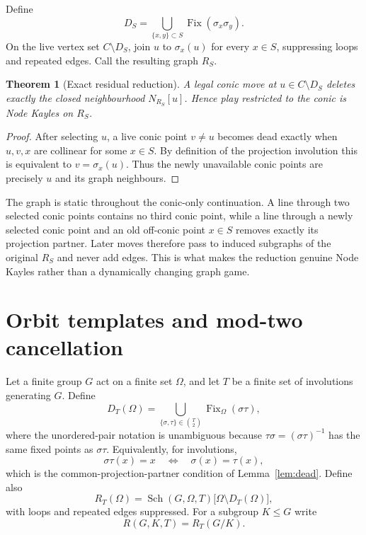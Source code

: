 \documentclass[11pt]{article}
\newtheorem{theorem}{Theorem}[section]
\theoremstyle{definition}
\theoremstyle{remark}
\DeclareMathOperator{\Fix}{Fix}
\DeclareMathOperator{\Sch}{Sch}
\begin{document}
Define
\begin{equation}
  D_S=\bigcup_{\{x,y\}\subset S}\Fix(\sigma_x\sigma_y).
  \label{eq:DS}
\end{equation}
On the live vertex set $C\setminus D_S$, join $u$ to $\sigma_x(u)$ for every $x\in S$, suppressing
loops and repeated edges. Call the resulting graph $R_S$.

\begin{theorem}[Exact residual reduction]
\label{thm:residual}
A legal conic move at $u\in C\setminus D_S$ deletes exactly the closed neighbourhood
$N_{R_S}[u]$. Hence play restricted to the conic is Node Kayles on $R_S$.
\end{theorem}

\begin{proof}
After selecting $u$, a live conic point $v\ne u$ becomes dead exactly when $u,v,x$ are collinear for
some $x\in S$. By definition of the projection involution this is equivalent to $v=\sigma_x(u)$.
Thus the newly unavailable conic points are precisely $u$ and its graph neighbours.
\end{proof}

The graph is static throughout the conic-only continuation. A line through two selected conic points
contains no third conic point, while a line through a newly selected conic point and an old
off-conic point $x\in S$ removes exactly its projection partner. Later moves therefore pass to
induced subgraphs of the original $R_S$ and never add edges. This is what makes the reduction
genuine Node Kayles rather than a dynamically changing graph game.

\section{Orbit templates and mod-two cancellation}
\label{sec:templates}

Let a finite group $G$ act on a finite set $\Omega$, and let $T$ be a finite set of involutions
generating $G$. Define
\begin{equation}
  D_T(\Omega)=\bigcup_{\{\sigma,\tau\}\in\binom{T}{2}}\Fix_\Omega(\sigma\tau),
  \label{eq:DT}
\end{equation}
where the unordered-pair notation is unambiguous because $\tau\sigma=(\sigma\tau)^{-1}$ has the same
fixed points as $\sigma\tau$. Equivalently, for involutions,
\[
  \sigma\tau(x)=x\quad\Longleftrightarrow\quad \sigma(x)=\tau(x),
\]
which is the common-projection-partner condition of Lemma~\ref{lem:dead}. Define also
\begin{equation}
  R_T(\Omega)=\Sch(G,\Omega,T)\bigl[\Omega\setminus D_T(\Omega)\bigr],
  \label{eq:RT}
\end{equation}
with loops and repeated edges suppressed. For a subgroup $K\le G$ write
\begin{equation}
  R(G,K,T)=R_T(G/K).
  \label{eq:template}
\end{equation}
\end{document}
